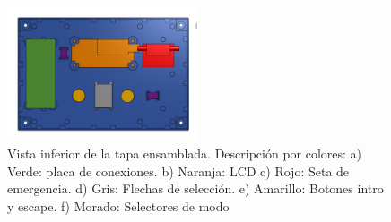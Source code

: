 \begin{figure}[h]%
    \centering 
        \includegraphics[width=0.5\textwidth]{04-caja/ensamblajetapainferior.png}
    \caption{Vista inferior de la tapa ensamblada. Descripción por colores: a) Verde: placa de 
    conexiones. b) Naranja: LCD c) Rojo: Seta de emergencia. d) Gris: Flechas de selección.
    e) Amarillo: Botones intro y escape. f) Morado: Selectores de modo}
    \label{fig:cajatapaensamblaje} 
\end{figure}